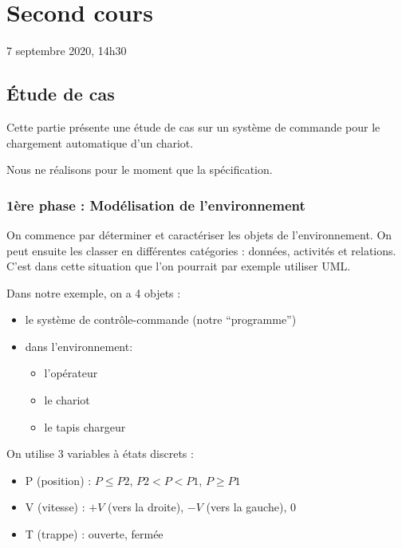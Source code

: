 \section{Second cours}

7 septembre 2020, 14h30

\hypertarget{uxe9tude-de-cas}{%
\subsection{Étude de cas}\label{uxe9tude-de-cas}}

Cette partie présente une étude de cas sur un système de commande pour
le chargement automatique d'un chariot.

Nous ne réalisons pour le moment que la spécification.

\hypertarget{uxe8re-phase-moduxe9lisation-de-lenvironnement}{%
\subsubsection{1ère phase : Modélisation de
l'environnement}\label{uxe8re-phase-moduxe9lisation-de-lenvironnement}}

On commence par déterminer et caractériser les objets de
l'environnement. On peut ensuite les classer en différentes catégories :
données, activités et relations. C'est dans cette situation que l'on
pourrait par exemple utiliser UML.

Dans notre exemple, on a 4 objets :

\begin{itemize}
\tightlist
\item
  le système de contrôle-commande (notre ``programme'')
\item
  dans l'environnement:

  \begin{itemize}
  \tightlist
  \item
    l'opérateur
  \item
    le chariot
  \item
    le tapis chargeur
  \end{itemize}
\end{itemize}

On utilise 3 variables à états discrets :

\begin{itemize}
\tightlist
\item
  P (position) : \(P \leq P2\), \(P2 < P < P1\),
  \(P \geqslant P1\)
\item
  V (vitesse) : \(+V\) (vers la droite), \(-V\) (vers la gauche), 0
\item
  T (trappe) : ouverte, fermée
\end{itemize}

